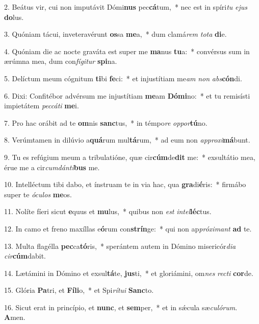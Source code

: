 2. Beátus vir, cui non imputávit Dómi\textbf{nus} pec\textbf{cá}tum,~*  nec est in spíri\textit{tu} \textit{e}\textit{jus} \textbf{do}lus.\

3. Quóniam tácui, inveteravérunt \textbf{os}sa \textbf{me}a,~*  dum clamá\textit{rem} \textit{to}\textit{ta} \textbf{di}e.\

4. Quóniam die ac nocte graváta est super me \textbf{ma}nus \textbf{tu}a:~*  convérsus sum in ærúmna mea, dum con\textit{fí}\textit{gi}\textit{tur} \textbf{spi}na.\

5. Delíctum meum cógnitum \textbf{ti}bi \textbf{fe}ci:~*  et injustítiam me\textit{am} \textit{non} \textit{abs}\textbf{cón}di.\

6. Dixi: Confitébor advérsum me injustítiam \textbf{me}am \textbf{Dó}\textbf{mi}no:~*  et tu remisísti impietátem \textit{pec}\textit{cá}\textit{ti} \textbf{me}i.\

7. Pro hac orábit ad te \textbf{om}nis \textbf{sanc}tus,~*  in témpo\textit{re} \textit{op}\textit{por}\textbf{tú}no.\

8. Verúmtamen in dilúvio a\textbf{quá}rum mul\textbf{tá}rum,~*  ad eum non \textit{ap}\textit{pro}\textit{xi}\textbf{má}bunt.\

9. Tu es refúgium meum a tribulatióne, quæ cir\textbf{cúm}de\textbf{dit} me:~*  exsultátio mea, érue me a cir\textit{cum}\textit{dán}\textit{ti}\textbf{bus} me.\

10. Intelléctum tibi dabo, et ínstruam te in via hac, qua \textbf{gra}di\textbf{é}ris:~*  firmábo super te \textit{ó}\textit{cu}\textit{los} \textbf{me}os.\

11. Nolíte fíeri sicut \textbf{e}quus et \textbf{mu}lus,~*  quibus non \textit{est} \textit{in}\textit{tel}\textbf{léc}tus.\

12. In camo et freno maxíllas e\textbf{ó}rum con\textbf{strín}ge:~*  qui non ap\textit{pró}\textit{xi}\textit{mant} \textbf{ad} te.\

13. Multa flagélla \textbf{pec}ca\textbf{tó}ris,~*  sperántem autem in Dómino misericór\textit{di}\textit{a} \textit{cir}\textbf{cúm}dabit.\

14. Lætámini in Dómino et exsul\textbf{tá}te, \textbf{jus}ti,~*  et gloriámini, om\textit{nes} \textit{rec}\textit{ti} \textbf{cor}de.\

15. Glória \textbf{Pa}tri, et \textbf{Fí}\textbf{li}o,~*  et Spi\textit{rí}\textit{tu}\textit{i} \textbf{Sanc}to.\

16. Sicut erat in princípio, et \textbf{nunc}, et \textbf{sem}per,~*  et in sǽcula sæ\textit{cu}\textit{ló}\textit{rum}. \textbf{A}men.\

